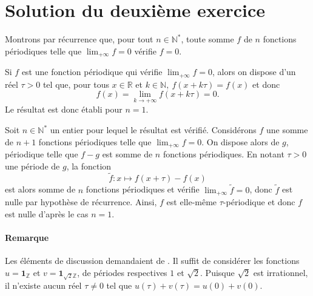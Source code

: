 \section{Solution du deuxième exercice}

Montrons par récurrence que, pour tout $n \in \mathbb N^*$, toute somme $f$ de $n$
fonctions périodiques telle que $\lim_{+\infty} f = 0$ vérifie $f = 0$.

Si $f$ est une fonction périodique qui vérifie $\lim_{+\infty} f = 0$, alors on
dispose d'un réel $\tau > 0$ tel que, pour tous $x \in \mathbb R$ et $k \in
\mathbb N,\ f(x+k\tau) = f(x)$ et donc
$$
f(x) = \lim_{k\to +\infty} f(x + k\tau) = 0.
$$
Le résultat est donc établi pour $n = 1$.

Soit $n \in \mathbb N^*$ un entier pour lequel le résultat est
  vérifié.
  Considérons $f$ une somme de $n+1$ fonctions périodiques
  telle que $\lim_{+\infty} f = 0$.  On dispose alors de $g$,
  périodique telle que $f- g$ est somme de $n$ fonctions
  périodiques.  En notant $\tau > 0$ une période de $g$, la fonction
    $$
        \tilde f : x\longmapsto f(x+\tau) - f(x)
    $$
  est alors somme de $n$ fonctions périodiques et vérifie
  $\lim_{+\infty} \tilde f =0$,
  donc $\tilde f$ est nulle par hypothèse de récurrence. Ainsi, $f$ est
  elle-même $\tau$-périodique et donc $f$ est nulle d'après le cas $n = 1$.

\paragraph{Remarque}

Les éléments de discussion demandaient de  \fg{}. 
Il suffit de considérer les fonctions $u = \mathbf 1_{\mathbb Z}$ et $v = \mathbf
1_{\sqrt 2 \mathbb Z}$, de périodes respectives $1$ et $\sqrt 2$. Puisque $\sqrt 2$ est irrationnel, il n'existe aucun réel $\tau \neq 0$ tel que
$u(\tau) + v(\tau) = u(0) + v(0)$.
